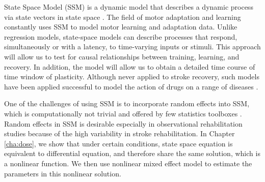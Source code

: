 State Space Model (SSM) is a dynamic model that describes a dynamic process via state vectors in state space \cite{}.
The field of motor adaptation and learning constantly uses SSM to model motor learning and adaptation data.
Unlike regression models, state-space models can describe processes that respond, simultaneously or with a latency, to time-varying inputs or stimuli.
This approach will allow us to test for causal relationships between training, learning, and recovery. 
In addition, the model will allow us to obtain a detailed time course of time window of plasticity. 
Although never applied to stroke recovery, such models have been applied successful to model the action of drugs on a range of diseases \cite{80,81}. 

One of the challenges of using SSM is to incorporate random effects into SSM, which is computationally not trivial and offered by few statistics toolboxes \cite{}.
Random effects in SSM is desirable especially in observational rehabilitation studies because of the high variability in stroke rehabilitation.
In Chapter \ref{cha:dose}, we show that under certain conditions, state space equation is equivalent to differential equation, and therefore share the same solution, which is a nonlinear function.
We then use nonlinear mixed effect model to estimate the parameters in this nonlinear solution.
